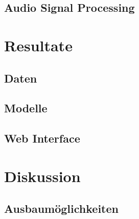 \documentclass{article}
\begin{document}
	\subsection{Audio Signal Processing}
	\section{Resultate}
	\subsection{Daten}
	\subsection{Modelle}
	\subsection{Web Interface}
	\section{Diskussion}
	\subsection{Ausbaumöglichkeiten}
	
	\listoffigures
	
	
\end{document}
